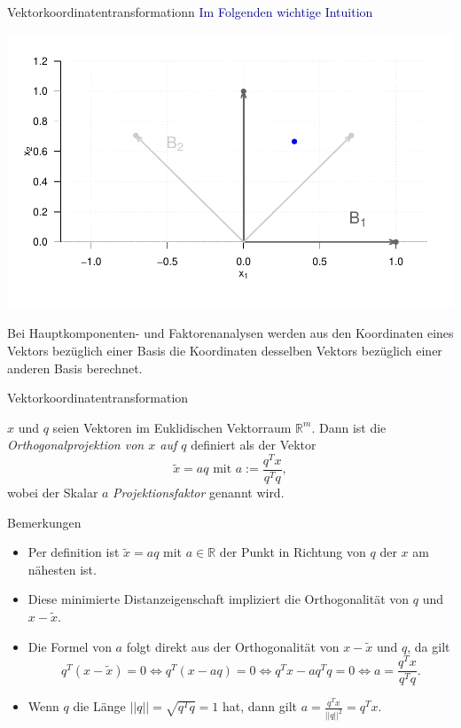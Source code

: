 \documentclass[
  8pt,
  ignorenonframetext,
]{beamer}
\begin{document}
\begin{frame}{Vektorkoordinatentransformationn}
\protect\hypertarget{vektorkoordinatentransformationn}{}
\textcolor{darkblue}{Im Folgenden wichtige Intuition} \vspace{1mm}

\begin{center}\includegraphics[width=0.7\linewidth]{4_Abbildungen/mvda_4_basen_R2} \end{center}

\small

Bei Hauptkomponenten- und Faktorenanalysen werden aus den Koordinaten
eines Vektors bezüglich einer Basis die Koordinaten desselben Vektors
bezüglich einer anderen Basis berechnet.
\end{frame}

\begin{frame}{Vektorkoordinatentransformation}
\protect\hypertarget{vektorkoordinatentransformation-1}{}
\small
\begin{definition}[Orthogonalprojektion]
$x$ und $q$ seien Vektoren im Euklidischen Vektorraum $\mathbb{R}^m$. Dann ist die
\textit{Orthogonalprojektion von $x$ auf $q$} definiert als der Vektor
\begin{equation}
\tilde{x} = aq \mbox{ mit } a := \frac{q^T x}{q^T q},
\end{equation}
wobei der Skalar $a$ \textit{Projektionsfaktor} genannt wird.
\end{definition}

\footnotesize

Bemerkungen

\begin{itemize}
\item Per definition ist  $\tilde{x} = aq$ mit $a \in \mathbb{R}$ der Punkt in Richtung von $q$ der $x$ am nähesten ist.
\item Diese minimierte Distanzeigenschaft impliziert die Orthogonalität von $q$ und $x - \tilde{x}$.
\item Die Formel von $a$ folgt direkt aus der Orthogonalität von $x - \tilde{x}$ und $q$, da gilt
\begin{equation*}
q^T(x - \tilde{x}) = 0
\Leftrightarrow
q^T(x - aq) = 0
\Leftrightarrow
q^Tx - aq^Tq = 0
\Leftrightarrow
a = \frac{q^Tx}{q^Tq}.
\end{equation*}
\item Wenn $q$ die Länge $||q|| = \sqrt{q^Tq} = 1$ hat, dann gilt $a = \frac{q^T x}{||q||^2} = q^T x$.
\end{itemize}
\end{frame}
\end{document}
